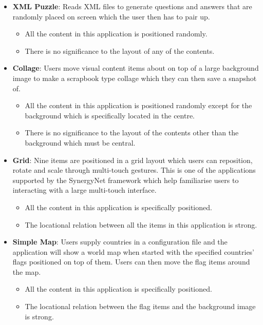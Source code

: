 \documentclass[review,5p,times,twocolumn]{elsarticle}
\begin{document}
\begin{itemize}
  \item \textbf{XML Puzzle}: 
  Reads XML files to generate questions and answers that are randomly placed on screen which the user then has to pair up. 
  \begin{itemize}
    \item  All the content in this application is positioned randomly. 
    \item There is no significance to the layout of any of the contents.
  \end{itemize}
  \item \textbf{Collage}: 
  Users move visual content items about on top of a large background image to make a scrapbook type collage which they can then save a snapshot of. 
    \begin{itemize}
    \item  All the content in this application is positioned randomly except for the background which is specifically located in the centre.
    \item There is no significance to the layout of the contents other than the background which must be central.
  \end{itemize}
  \item \textbf{Grid}: 
  Nine items are positioned in a grid layout which users can reposition, rotate and scale through multi-touch gestures.
  This is one of the applications supported by the SynergyNet framework which help familiarise users to interacting with a large multi-touch interface. 
    \begin{itemize}
    \item  All the content in this application is specifically positioned.
    \item The locational relation between all the items in this application is strong.
  \end{itemize}
    \item \textbf{Simple Map}: 
  Users supply countries in a configuration file and the application will show a world map when started with the specified countries' flags positioned on top of them. 
  Users can then move the flag items around the map.
    \begin{itemize}
    \item  All the content in this application is specifically positioned.
    \item The locational relation between the flag items and the background image is strong.
  \end{itemize}
\end{itemize}
\end{document}

